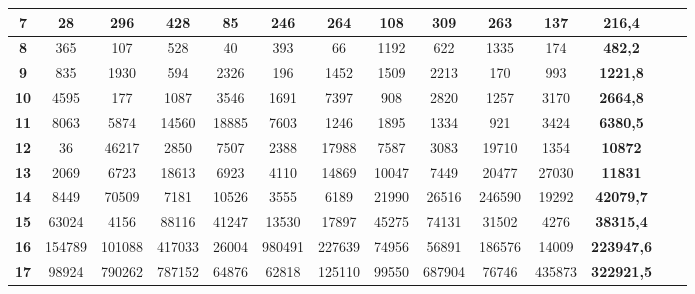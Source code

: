 \documentclass[10pt,a4paper,spanish]{report}
\begin{document}
\begin{table}[h!]
\begin{adjustbox}{max width=\textwidth}
\begin{tabular}{*{14}{|c}|}
   \textbf{7}                       & 28         & 296        & 428        & 85         & 246        & 264        & 108        & 309        & 263        & 137         & \textbf{216,4}      \\ \hline
   \textbf{8}                       & 365        & 107        & 528        & 40         & 393        & 66         & 1192       & 622        & 1335       & 174         & \textbf{482,2}      \\ \hline
   \textbf{9}                       & 835        & 1930       & 594        & 2326       & 196        & 1452       & 1509       & 2213       & 170        & 993         & \textbf{1221,8}     \\ \hline
   \textbf{10}                      & 4595       & 177        & 1087       & 3546       & 1691       & 7397       & 908        & 2820       & 1257       & 3170        & \textbf{2664,8}     \\ \hline
   \textbf{11}                      & 8063       & 5874       & 14560      & 18885      & 7603       & 1246       & 1895       & 1334       & 921        & 3424        & \textbf{6380,5}     \\ \hline
   \textbf{12}                      & 36         & 46217      & 2850       & 7507       & 2388       & 17988      & 7587       & 3083       & 19710      & 1354        & \textbf{10872}      \\ \hline
   \textbf{13}                      & 2069       & 6723       & 18613      & 6923       & 4110       & 14869      & 10047      & 7449       & 20477      & 27030       & \textbf{11831}      \\ \hline
   \textbf{14}                      & 8449       & 70509      & 7181       & 10526      & 3555       & 6189       & 21990      & 26516      & 246590     & 19292       & \textbf{42079,7}    \\ \hline
   \textbf{15}                      & 63024      & 4156       & 88116      & 41247      & 13530      & 17897      & 45275      & 74131      & 31502      & 4276        & \textbf{38315,4}    \\ \hline
   \textbf{16}                      & 154789     & 101088     & 417033     & 26004      & 980491     & 227639     & 74956      & 56891      & 186576     & 14009       & \textbf{223947,6}   \\ \hline
   \textbf{17}                      & 98924      & 790262     & 787152     & 64876      & 62818      & 125110     & 99550      & 687904     & 76746      & 435873      & \textbf{322921,5}   \\ \hline

\end{tabular}
\end{adjustbox}
\end{table}
\end{document}
